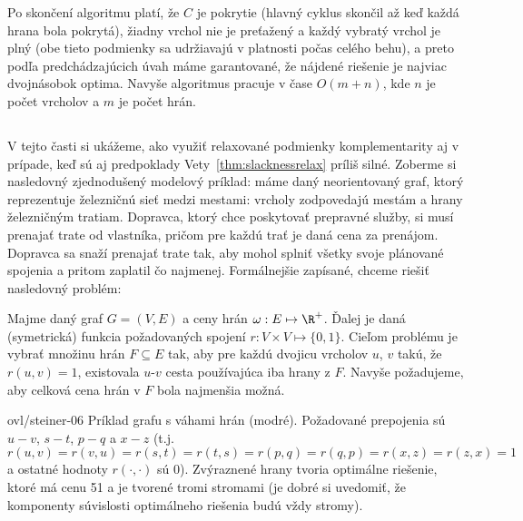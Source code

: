 \noindent
Po skončení algoritmu platí, že $C$ je pokrytie (hlavný cyklus skončil až keď každá hrana bola pokrytá),
žiadny vrchol nie je preťažený a každý vybratý vrchol je plný (obe tieto podmienky sa udržiavajú v platnosti
počas celého behu), a preto podľa predchádzajúcich úvah máme garantované, že nájdené riešenie je najviac
dvojnásobok optima. Navyše algoritmus pracuje v čase $O(m+n)$, kde $n$ je počet vrcholov a $m$ je počet hrán.


\subsection*{\minsforest}

\noindent
V tejto časti si ukážeme, ako využiť relaxované podmienky komplementarity aj v prípade, keď sú aj
predpoklady Vety~\ref{thm:slacknessrelax} príliš silné. Zoberme si nasledovný zjednodušený modelový príklad:
máme daný neorientovaný graf, ktorý reprezentuje železničnú sieť medzi mestami: vrcholy zodpovedajú mestám a hrany
železničným tratiam. Dopravca, ktorý chce poskytovať prepravné služby, si musí 
prenajať trate od vlastníka, pričom pre každú trať je daná cena za prenájom. Dopravca sa snaží prenajať
trate tak, aby mohol splniť všetky svoje plánované spojenia a pritom zaplatil čo najmenej. Formálnejšie
zapísané, chceme riešiť nasledovný problém:

\begin{framed}
  \begin{dfn}
    Majme daný graf $G=(V,E)$ a ceny hrán $\omega:E\mapsto\R^+$. Ďalej je daná (symetrická) 
    funkcia požadovaných spojení
    $r:V\times V\mapsto\{0,1\}$. Cieľom problému \minsforest je vybrať množinu hrán $F\subseteq E$ tak, 
    aby pre každú dvojicu vrcholov $u$, $v$ takú, že $r(u,v)=1$, existovala $u$-$v$ cesta používajúca iba hrany z 
    $F$. Navyše požadujeme, aby celková cena hrán v $F$ bola najmenšia možná.
  \end{dfn}
\end{framed}


\begin{myfig}{\textwidth}{ovl/steiner-06}
  Príklad grafu s váhami hrán (modré). Požadované prepojenia sú $u-v$, $s-t$, $p-q$ a $x-z$ (t.j.
  $r(u,v)=r(v,u)=r(s,t)=r(t,s)=r(p,q)=r(q,p)=r(x,z)=r(z,x)=1$ a ostatné hodnoty $r(\cdot,\cdot)$ sú 0).
  Zvýraznené hrany tvoria optimálne riešenie, ktoré má cenu 51 a je tvorené tromi stromami 
  (je dobré si uvedomiť, že komponenty súvislosti
  optimálneho riešenia budú vždy stromy).
\end{myfig}

